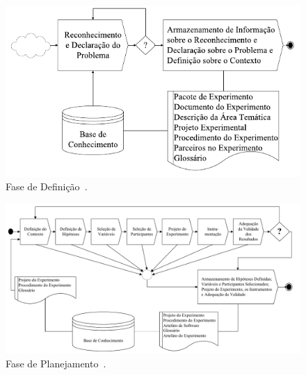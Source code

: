 \documentclass[aspectratio=169]{beamer}
\begin{document}
\begin{frame}
\justifying

\begin{figure}
\centering
\includegraphics[scale=0.5]{images/definicao.png}
\caption{Fase de Definição~\cite{Garcia06}.}
\label{image:definicao}
\end{figure}

\end{frame}

\begin{frame}
\justifying

\begin{figure}
\centering
\includegraphics[scale=0.3]{images/planejamento.png}
\caption{Fase de Planejamento~\cite{Garcia06}.}
\label{image:planejamento}
\end{figure}

\end{frame}
\end{document}
